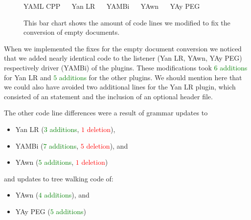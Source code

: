 \begin{figure}[H]
  \begin{bchart}[max=20, width=0.8\textwidth, unit={~Lines of Code}]
  \end{bchart}
  \begin{center}
  \vspace{-0.5cm}
     YAML CPP ~~
     Yan LR ~~
     YAMBi ~~
     YAwn ~~
     YAy PEG
  \vspace{-0.5cm}
  \end{center}
  \caption{This bar chart shows the amount of code lines we modified to fix the conversion of empty documents.}
  \label{fig:empty_document_count}
\end{figure}

When we implemented the fixes for the empty document conversion we noticed that we added nearly identical code to the listener (Yan LR, YAwn, YAy PEG) respectively driver (YAMBi) of the plugins. These modifications took \textcolor{Green}{$6$ additions} for Yan LR and \textcolor{Green}{$5$ additions} for the other plugins. We should mention here that we could also have avoided two additional lines for the Yan LR plugin, which consisted of an  statement and the inclusion of an optional header file.

The other code line differences were a result of grammar updates to

\begin{itemize}
  \item Yan LR (\textcolor{Green}{$3$ additions}, \textcolor{Red}{$1$ deletion}),
  \item YAMBi (\textcolor{Green}{$7$ additions}, \textcolor{Red}{$5$ deletion}), and
  \item YAwn (\textcolor{Green}{$5$ additions}, \textcolor{Red}{$1$ deletion})
\end{itemize}

and updates to tree walking code of:

\begin{itemize}
  \item YAwn (\textcolor{Green}{$4$ additions}), and
  \item YAy PEG (\textcolor{Green}{$5$ additions})
\end{itemize}


